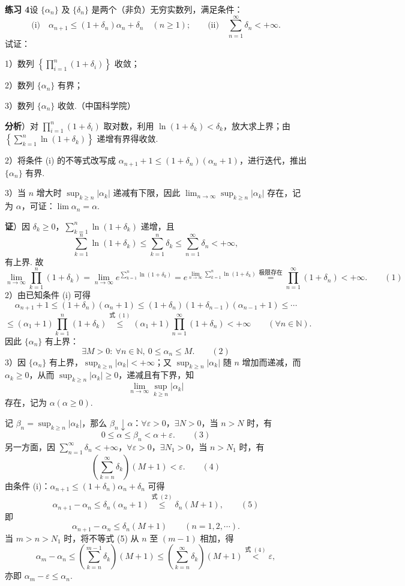 \documentclass[UTF8, 12pt, fontset=fandol, oneside]{ctexart}
\begin{document}
\noindent\textbf{练习 4}\quad 设 $\{\alpha_n\}$ 及 $\{\delta_n\}$ 是两个（非负）无穷实数列，满足条件：
\[
  \text{(i)}\quad \alpha_{n+1}\le(1+\delta_n)\alpha_n+\delta_n\quad(n\ge1);
  \qquad
  \text{(ii)}\quad \sum_{n=1}^\infty\delta_n<+\infty.
\]
试证：

1）数列 $\left\{\displaystyle\prod_{i=1}^n(1+\delta_i)\right\}$ 收敛；

2）数列 $\{\alpha_n\}$ 有界；

3）数列 $\{\alpha_n\}$ 收敛.（中国科学院）

\noindent\textbf{分析}）对 $\displaystyle\prod_{i=1}^n(1+\delta_i)$ 取对数，利用 $\ln(1+\delta_k)<\delta_k$，放大求上界；由 $\left\{\displaystyle\sum_{k=1}^n\ln(1+\delta_k)\right\}$ 递增有界得收敛.

2）将条件 (i) 的不等式改写成 $\alpha_{n+1}+1\le(1+\delta_n)(\alpha_n+1)$，进行迭代，推出 $\{\alpha_n\}$ 有界.

3）当 $n$ 增大时 $\sup_{k\ge n}|\alpha_k|$ 递减有下限，因此 $\displaystyle\lim_{n\to\infty}\sup_{k\ge n}|\alpha_k|$ 存在，记为 $\alpha$，可证：$\lim\alpha_n=\alpha$.

\noindent\textbf{证}）因 $\delta_k\ge0$，$\displaystyle\sum_{k=1}^n\ln(1+\delta_k)$ 递增，且
\[
  \sum_{k=1}^n\ln(1+\delta_k)\le\sum_{k=1}^n\delta_k\le\sum_{n=1}^\infty\delta_n<+\infty,
\]
有上界. 故
\[
  \lim_{n\to\infty}\prod_{k=1}^n(1+\delta_k)
  =\lim_{n\to\infty}e^{\sum_{k=1}^n\ln(1+\delta_k)}
  =e^{\lim_{n\to\infty}\sum_{k=1}^n\ln(1+\delta_k)}
  \stackrel{\text{极限存在}}{=}\prod_{n=1}^\infty(1+\delta_n)<+\infty.
\qquad(1)
\]
2）由已知条件 (i) 可得
\[
  \alpha_{n+1}+1\le(1+\delta_n)(\alpha_n+1)
  \le(1+\delta_n)(1+\delta_{n-1})(\alpha_{n-1}+1)\le\cdots
\]
\[
  \le(\alpha_1+1)\prod_{k=1}^n(1+\delta_k)
  \stackrel{\text{式 }(1)}{\le}
  (\alpha_1+1)\prod_{n=1}^\infty(1+\delta_n)<+\infty\qquad(\forall n\in\mathbb{N}).
\]
因此 $\{\alpha_n\}$ 有上界：
\[
  \exists M>0:\ \forall n\in\mathbb{N},\ 0\le\alpha_n\le M.
\qquad(2)
\]
3）因 $\{\alpha_n\}$ 有上界，$\sup_{k\ge n}|\alpha_k|<+\infty$；又 $\sup_{k\ge n}|\alpha_k|$ 随 $n$ 增加而递减，而 $\alpha_k\ge0$，从而 $\sup_{k\ge n}|\alpha_k|\ge0$，递减且有下界，知
\[
  \lim_{n\to\infty}\sup_{k\ge n}|\alpha_k|
\]
存在，记为 $\alpha(\alpha\ge0)$.

记 $\beta_n=\sup_{k\ge n}|\alpha_k|$，那么 $\beta_n\downarrow\alpha$：$\forall\varepsilon>0$，$\exists N>0$，当 $n>N$ 时，有
\[
  0\le\alpha\le\beta_n<\alpha+\varepsilon.
\qquad(3)
\]
另一方面，因 $\displaystyle\sum_{n=1}^\infty\delta_n<+\infty$，$\forall\varepsilon>0$，$\exists N_1>0$，当 $n>N_1$ 时，有
\[
  \left(\sum_{k=n}^\infty\delta_k\right)(M+1)<\varepsilon.
\qquad(4)
\]
由条件 (i)：$\alpha_{n+1}\le(1+\delta_n)\alpha_n+\delta_n$ 可得
\[
  \alpha_{n+1}-\alpha_n\le\delta_n(\alpha_n+1)
  \stackrel{\text{式 }(2)}{\le}\delta_n(M+1),
\qquad(5)
\]
即
\[
  \alpha_{n+1}-\alpha_n\le\delta_n(M+1)\qquad(n=1,2,\cdots).
\]
当 $m>n>N_1$ 时，将不等式 (5) 从 $n$ 至 $(m-1)$ 相加，得
\[
  \alpha_m-\alpha_n\le\left(\sum_{k=n}^{m-1}\delta_k\right)(M+1)
  \le\left(\sum_{k=n}^{\infty}\delta_k\right)(M+1)
  \stackrel{\text{式 }(4)}{<}\varepsilon,
\]
亦即 $\alpha_m-\varepsilon\le\alpha_n$.
\end{document}
